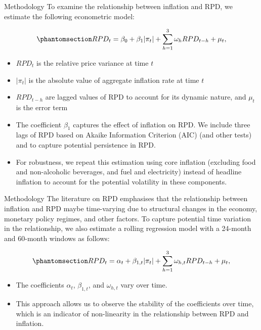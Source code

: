 \documentclass[
  ignorenonframetext,
]{beamer}
\providecommand{\tightlist}{%
  \setlength{\itemsep}{0pt}\setlength{\parskip}{0pt}}\usepackage{longtable,booktabs,array}
\begin{document}
\begin{frame}{Methodology}
\label{methodology-2}
To examine the relationship between inflation and RPD, we estimate the
following econometric model:

\begin{equation}\phantomsection\label{eq-rpd_reg}{RPD_{t} = \beta_0 + \beta_1|\pi_{t}| + \sum_{h=1}^{3}\omega_hRPD_{t-h}  +  \mu_{t}, }\end{equation}

\begin{itemize}
\tightlist
\item
  \(RPD_{t}\) is the relative price variance at time \(t\)
\item
  \(|\pi_{t}|\) is the absolute value of aggregate inflation rate at
  time \(t\)
\item
  \(RPD_{t-h}\) are lagged values of RPD to account for its dynamic
  nature, and \(\mu_{t}\) is the error term
\item
  The coefficient \(\beta_1\) captures the effect of inflation on RPD.
  We include three lags of RPD based on Akaike Information Criterion
  (AIC) (and other tests) and to capture potential persistence in RPD.
\item
  For robustness, we repeat this estimation using core inflation
  (excluding food and non-alcoholic beverages, and fuel and electricity)
  instead of headline inflation to account for the potential volatility
  in these components.
\end{itemize}
\end{frame}

\begin{frame}{Methodology}
\label{methodology-3}
The literature on RPD emphasises that the relationship between inflation
and RPD maybe time-varying due to structural changes in the economy,
monetary policy regimes, and other factors. To capture potential time
variation in the relationship, we also estimate a rolling regression
model with a 24-month and 60-month windows as follows:

\begin{equation}\phantomsection\label{eq-rpd_rolling_reg}{RPD_{t} = \alpha_{t} + \beta_{1,t}|\pi_{t}| + \sum_{h=1}^{3}\omega_{h,t}RPD_{t-h}  +  \mu_{t}, }\end{equation}

\begin{itemize}
\tightlist
\item
  The coefficients \(\alpha_{t}\), \(\beta_{1,t}\), and \(\omega_{h,t}\)
  vary over time.
\item
  This approach allows us to observe the stability of the coefficients
  over time, which is an indicator of non-linearity in the relationship
  between RPD and inflation.
\end{itemize}
\end{frame}
\end{document}
